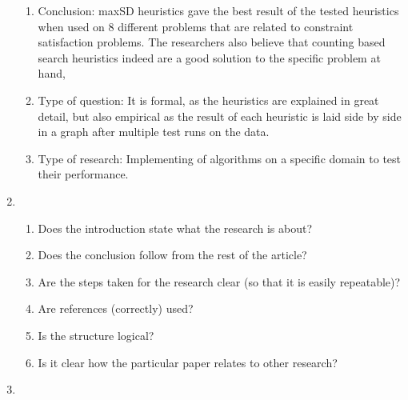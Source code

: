 \documentclass{article}
\begin{document}
\begin{enumerate}
{\begin{enumerate}
{\begin{enumerate}
            \item Conclusion: maxSD heuristics gave the best result of the tested heuristics when used on 8 different problems that are related to constraint satisfaction problems. The researchers also believe that counting based search heuristics indeed are a good solution to the specific problem at hand,
            \item Type of question: It is formal, as the heuristics are explained in great detail, but also empirical as the result of each heuristic is laid side by side in a graph after multiple test runs on the data.
            \item Type of research: Implementing of algorithms on a specific domain to test their performance.
        \end{enumerate}
        }    
    \end{enumerate}
    }
    \item{
    \begin{enumerate}
    \item{Does the introduction state what the research is about?}
    \item{Does the conclusion follow from the rest of the article?}
    \item{Are the steps taken for the research clear (so that it is easily repeatable)?}
    \item{Are references (correctly) used?}
    \item{Is the structure logical?}
    \item{Is it clear how the particular paper relates to other research?}
    \end{enumerate}
    }
    \clearpage
    \item{
    
}
\end{enumerate}
\end{document}
